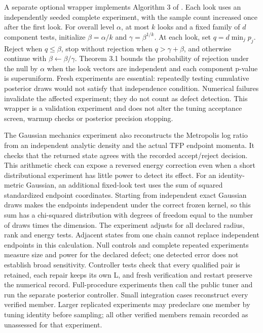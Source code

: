 A separate optional wrapper implements Algorithm 3 of
\citet{gandy2021mcmctesting}. Each look uses an independently seeded complete
experiment, with the sample count increased once after the first look. For
overall level $\alpha$, at most $k$ looks and a fixed family of $d$ component
tests, initialize $\beta=\alpha/k$ and $\gamma=\beta^{1/k}$. At each look,
set $q=d\min_j p_j$. Reject when $q\leq\beta$, stop without rejection when
$q>\gamma+\beta$, and otherwise continue with $\beta\leftarrow\beta/\gamma$.
Theorem 3.1 bounds the probability of rejection under the null by $\alpha$
when the look vectors are independent and each component p-value is
superuniform. Fresh experiments are essential: repeatedly testing cumulative
posterior draws would not satisfy that independence condition. Numerical
failures invalidate the affected experiment; they do not count as defect
detection. This wrapper is a validation experiment and does not alter the
tuning acceptance screen, warmup checks or posterior precision stopping.

The Gaussian mechanics experiment also reconstructs the Metropolis log ratio
from an independent analytic density and the actual TFP endpoint momenta. It
checks that the returned state agrees with the recorded accept/reject decision.
This arithmetic check can expose a reversed energy correction even when a short
distributional experiment has little power to detect its effect.
For an identity-metric Gaussian, an additional fixed-look test uses the sum
of squared standardized endpoint coordinates. Starting from independent exact
Gaussian draws makes the endpoints independent under the correct frozen
kernel, so this sum has a chi-squared distribution with degrees of freedom
equal to the number of draws times the dimension. The experiment adjusts for
all declared radius, rank and energy tests. Adjacent states from one chain
cannot replace independent endpoints in this calculation. Null controls and
complete repeated experiments measure size and power for the declared defect;
one detected error does not establish broad sensitivity.
Controller tests check that every qualified pair is retained, each repair keeps
its own L, and fresh verification and restart preserve the numerical record.
Full-procedure experiments then call the public tuner and run the separate
posterior controller. Small integration cases reconstruct every verified member.
Larger replicated experiments may predeclare one member by tuning identity
before sampling; all other verified members remain recorded as unassessed for
that experiment.

